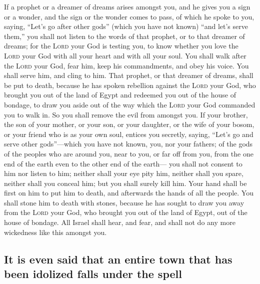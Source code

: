  If a prophet or a dreamer of dreams arises amongst you,
and he gives you a sign or a wonder,  and the sign or the
wonder comes to pass, of which he spoke to you, saying, ``Let's go after
other gods'' (which you have not known) ``and let's serve them,''
 you shall not listen to the words of that prophet, or to
that dreamer of dreams; for the \textsc{Lord} your God is testing you,
to know whether you love the \textsc{Lord} your God with all your heart
and with all your soul.  You shall walk after the
\textsc{Lord} your God, fear him, keep his commandments, and obey his
voice. You shall serve him, and cling to him.  That
prophet, or that dreamer of dreams, shall be put to death, because he
has spoken rebellion against the \textsc{Lord} your God, who brought you
out of the land of Egypt and redeemed you out of the house of bondage,
to draw you aside out of the way which the \textsc{Lord} your God
commanded you to walk in. So you shall remove the evil from amongst you.
 If your brother, the son of your mother, or your son, or
your daughter, or the wife of your bosom, or your friend who is as your
own soul, entices you secretly, saying, ``Let's go and serve other
gods''---which you have not known, you, nor your fathers; 
of the gods of the peoples who are around you, near to you, or far off
from you, from the one end of the earth even to the other end of the
earth---  you shall not consent to him nor listen to him;
neither shall your eye pity him, neither shall you spare, neither shall
you conceal him;  but you shall surely kill him. Your hand
shall be first on him to put him to death, and afterwards the hands of
all the people.  You shall stone him to death with
stones, because he has sought to draw you away from the \textsc{Lord}
your God, who brought you out of the land of Egypt, out of the house of
bondage.  All Israel shall hear, and fear, and shall not
do any more wickedness like this amongst you.

\hypertarget{it-is-even-said-that-an-entire-town-that-has-been-idolized-falls-under-the-spell}{%
\subsection{It is even said that an entire town that has been idolized
falls under the
spell}\label{it-is-even-said-that-an-entire-town-that-has-been-idolized-falls-under-the-spell}}


